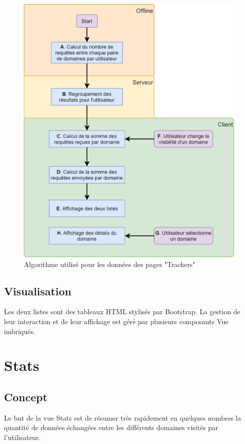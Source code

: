		\begin{figure}[!h]
			\centering
			\includegraphics[height=0.95\textwidth]{images/design/pages/trackers_algo}
			\caption{Algorithme utilisé pour les données des pages "Trackers"}
			\label{trackers_algo}
		\end{figure}

	\subsection{Visualisation}

		Les deux listes sont des tableaux HTML stylisés par Bootstrap. La gestion de leur interaction et de leur affichage est géré par plusieurs composants Vue imbriqués.

\clearpage

%
%
%
%

\section{Stats}

	\subsection{Concept}

		Le but de la vue Stats est de résumer très rapidement en quelques nombres la quantité de données échangées entre les différents domaines visités par l'utilisateur.

